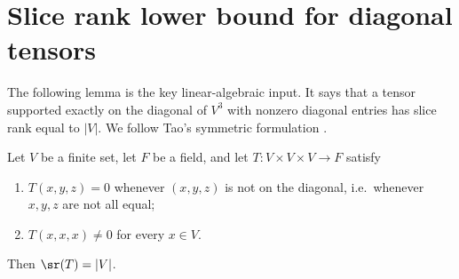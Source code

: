 \section{Slice rank lower bound for diagonal tensors}
\label{sec:slice-rank-lower-bound}

The following lemma is the key linear-algebraic input. It says that a tensor supported exactly on the diagonal of $V^3$ with nonzero diagonal entries has slice rank equal to $|V|$. We follow Tao's symmetric formulation \cite{Tao2016blog}.

\begin{lemma}\label{lem:slice-rank-diagonal}
Let $V$ be a finite set, let $F$ be a field, and let $T: V \times V \times V \to F$ satisfy
\begin{enumerate}[label=(\roman*), ref=\ref*{lem:slice-rank-diagonal}(\roman*)]
    \item\label{lem:slice-rank-diagonal:diag} $T(x, y, z) = 0$ whenever $(x, y, z)$ is not on the diagonal, i.e.\ whenever $x, y, z$ are not all equal;
    \item\label{lem:slice-rank-diagonal:nz} $T(x, x, x) \ne 0$ for every $x \in V$.
\end{enumerate}
Then $\sr(T) = |V|$.
\end{lemma}

